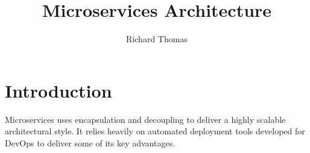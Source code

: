 \title{Microservices Architecture}
\author{Richard Thomas}
\date{}

\maketitle

\section{Introduction}\label{sec:intro}

Microservices uses encapsulation and decoupling to deliver a highly scalable architectural style.
It relies heavily on automated deployment tools developed for DevOps to deliver some of its key advantages.

